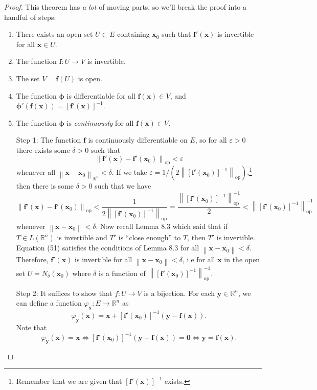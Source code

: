 \documentclass{article}
\newcommand{\R}{\mathbb{R}}
\newcommand{\x}{\mathbf{x}}
\newcommand{\f}{\mathbf{f}}
\newcommand{\y}{\mathbf{y}}
\newcommand{\ze}{\mathbf{0}}
\newcommand{\norm}[1]{\left\lVert#1\right\rVert}
\newcommand{\normop}[1]{\left\lVert#1\right\rVert_\text{op}}
\theoremstyle{definition}
\begin{document}
	\begin{proof}
		This theorem has \textit{a lot} of moving parts, so we'll break the proof into a handful of steps:
		\begin{enumerate}
			\item There exists an open set $ U\subset E $ containing $ \x_0 $ such that $ \f'(\x) $ is invertible for all $ \x \in U $. 
			\item The function $ \f:U\to V $ is invertible. 
			\item The set $ V = \f(U) $ is open. 
			\item The function $ \boldsymbol{\phi} $ is differentiable for all $ \f(\x)\in V $, and $ \boldsymbol{\phi}'(\f(\x)) = [\f'(\x)]^{-1}$. 
			\item The function $ \boldsymbol{\phi} $ is \textit{continuously} for all $ \f(\x)\in V $. 
		\end{enumerate}
		\begin{enumerate}
			\item [Step 1:]The function $ \f $ is continuously differentiable on $ E $, so for all $ \varepsilon > 0 $ there exists some $ \delta > 0 $ such that $$\normop{\f'(\x) - \f'(\x_0)} < \varepsilon$$ whenever all $ \norm{\x - \x_0}_{\R^n} < \delta $. If we take $ \varepsilon = 1/\left(2\normop{[\f'(\x_0)]^{-1}} \right)$,\footnote{Remember that we are given that $ [\f'(\x)]^{-1} $ exists.} then there is some $ \delta > 0$ such that we have 
			\begin{equation}\label{key}
				\normop{\f'(\x) - \f'(\x_0)} < \frac{1}{2\normop{[\f'(\x_0)]^{-1}}} = \frac{\normop{[\f'(\x_0)]^{-1}}^{-1}}{2} < \normop{[\f'(\x_0)]^{-1}}^{-1} 
			\end{equation} whenever $ \norm{\x - \x_0} < \delta $. Now recall Lemma 8.3 which said that if $ T\in L(\R^n) $ is invertible and $ T' $ is ``close enough'' to $ T $, then $ T' $ is invertible. Equation (51) satisfies the conditions of Lemma 8.3 for all $ \norm{\x-\x_0}<\delta $. Therefore, $ \f'(\x) $ is invertible for all $ \norm{\x-\x_0}<\delta $, i.e for all $ \x $ in the open set $U= N_\delta(\x_0) $ where $ \delta $ is a function of  $  \normop{[\f'(\x_0)]^{-1}}^{-1}   $. 
			\item [Step 2:]It suffices to show that $ f:U\to V $ is a bijection. For each $ \y\in\R^n $, we can define a function $ \varphi_\y:E\to \R^n $ as 
			$$ \varphi_\y(\x) = \x + [\f'(\x_0)]^{-1}(\y - \f(\x)) .$$ 
			Note that \begin{equation}\label{key}
				\varphi_\y(\x) = \x \iff [\f'(\x_0)]^{-1}(\y - \f(\x)) = \ze \iff \y = \f(\x) .

\end{equation}
\end{enumerate}
\end{proof}
\end{document}
